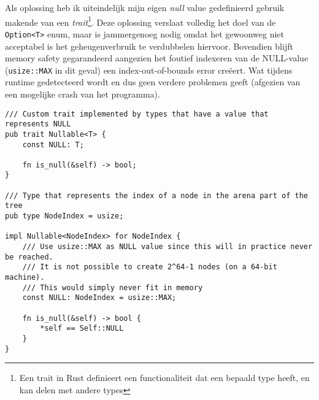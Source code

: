 Als oplossing heb ik uiteindelijk mijn eigen \textit{null} value gedefinieerd gebruik makende van een \textit{trait}\footnote{Een trait in Rust definieert een functionaliteit dat een bepaald type heeft, en kan delen met andere types}.
Deze oplossing verslaat volledig het doel van de \texttt{Option<T>} enum, maar is jammergenoeg nodig omdat het gewoonweg niet acceptabel is het geheugenverbruik te verdubbelen hiervoor.
Bovendien blijft memory safety gegarandeerd aangezien het foutief indexeren van de NULL-value (\texttt{usize::MAX} in dit geval) een index-out-of-bounds error creëert.
Wat tijdens runtime gedetecteerd wordt en dus geen verdere problemen geeft (afgezien van een mogelijke crash van het programma).

\begin{verbatim}
/// Custom trait implemented by types that have a value that represents NULL
pub trait Nullable<T> {
    const NULL: T;

    fn is_null(&self) -> bool;
}

/// Type that represents the index of a node in the arena part of the tree
pub type NodeIndex = usize;

impl Nullable<NodeIndex> for NodeIndex {
    /// Use usize::MAX as NULL value since this will in practice never be reached.
    /// It is not possible to create 2^64-1 nodes (on a 64-bit machine).
    /// This would simply never fit in memory
    const NULL: NodeIndex = usize::MAX;

    fn is_null(&self) -> bool {
        *self == Self::NULL
    }
}
\end{verbatim}

